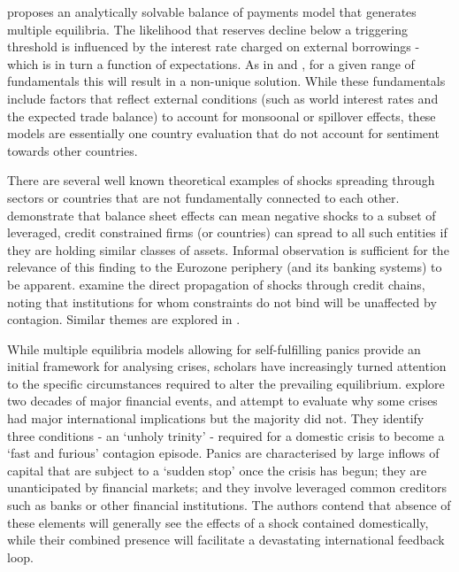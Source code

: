 \documentclass[../base.tex]{subfiles}
\begin{document}
\cite{masson1999contagion} proposes an analytically solvable balance of payments model that generates multiple equilibria. The likelihood that reserves decline below a triggering threshold is influenced by the interest rate charged on external borrowings - which is in turn a function of expectations. As in \cite{obstfeld1996models} and \cite{jeanne1997currency}, for a given range of fundamentals this will result in a non-unique solution. While these fundamentals include factors that reflect external conditions (such as world interest rates and the expected trade balance) to account for monsoonal or spillover effects, these models are essentially one country evaluation that do not account for sentiment towards other countries. 

There are several well known theoretical examples of shocks spreading through sectors or countries that are not fundamentally connected to each other. \cite{kiyotaki2002balance} demonstrate that balance sheet effects can mean negative shocks to a subset of leveraged, credit constrained firms (or countries) can spread to all such entities if they are holding similar classes of assets. Informal observation is sufficient for the relevance of this finding to the Eurozone periphery (and its banking systems) to be apparent. \cite{kiyotaki1997credit} examine the direct propagation of shocks through credit chains, noting that institutions for whom constraints do not bind will be unaffected by contagion. Similar themes are explored in \cite{rochet1996interbank}.

While multiple equilibria models allowing for self-fulfilling panics provide an initial framework for analysing crises, scholars have increasingly turned attention to the specific circumstances required to alter the prevailing equilibrium. \cite{kaminsky2003unholy} explore two decades of major financial events, and attempt to evaluate why some crises had major international implications but the majority did not. They identify three conditions - an `unholy trinity' - required for a domestic crisis to become a `fast and furious' contagion episode. Panics are characterised by large inflows of capital that are subject to a `sudden stop' once the crisis has begun; they are unanticipated by financial markets; and they involve leveraged common creditors such as banks or other financial institutions. The authors contend that absence of these elements will generally see the effects of a shock contained domestically, while their combined presence will facilitate a devastating international feedback loop. 
\end{document}
